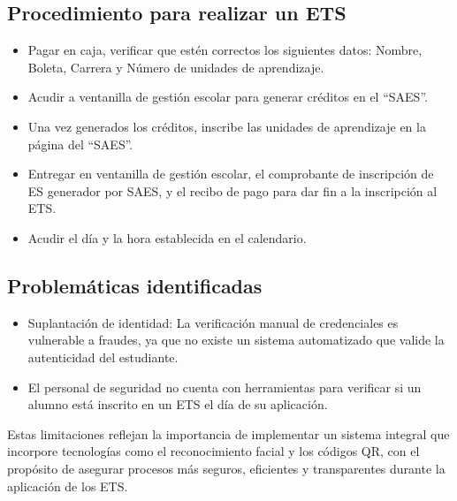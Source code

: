 \subsection{Procedimiento para realizar un ETS}
\begin{itemize}
	\item Pagar en caja, verificar que estén correctos los siguientes datos: Nombre, Boleta, Carrera y Número de unidades de aprendizaje.
	\item Acudir a ventanilla de gestión escolar para generar créditos en el “SAES”.
	\item Una vez generados los créditos, inscribe las unidades de aprendizaje en la página del “SAES”.
	\item Entregar en ventanilla de gestión escolar, el comprobante de inscripción de ES generador por SAES, y el recibo de pago para dar fin a la inscripción al ETS. 
	\item  Acudir el día y la hora establecida en el calendario.
\end{itemize}

\subsection{Problemáticas identificadas}
\begin{itemize}
	\item Suplantación de identidad: La verificación manual de credenciales es vulnerable a fraudes, ya que no existe un sistema automatizado que valide la autenticidad del estudiante.
	\item El personal de seguridad no cuenta con herramientas para verificar si un alumno está inscrito en un ETS el día de su aplicación.
\end{itemize}

Estas limitaciones reflejan la importancia de implementar un sistema integral que incorpore tecnologías como el reconocimiento facial y los códigos QR, con el propósito de asegurar procesos más seguros, eficientes y transparentes durante la aplicación de los ETS.